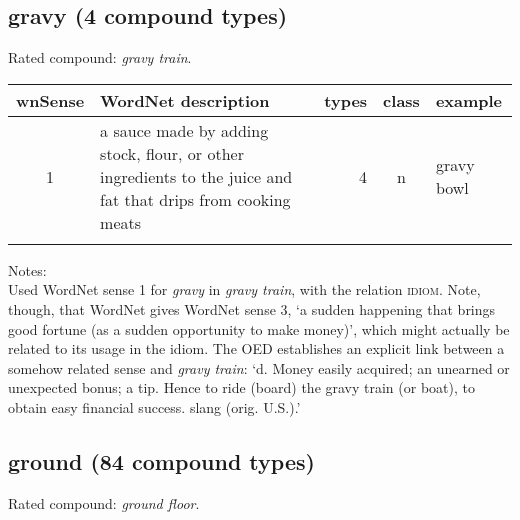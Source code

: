 \subsection{gravy        (4 compound types)}
Rated compound: \emph{gravy train}.


\noindent
\begin{longtable}{c>{\raggedright\arraybackslash}p{5cm}rc>{\raggedright\arraybackslash}p{2cm}}\lsptoprule
{\small wnSense}&WordNet description&types&class&example\\\midrule
1&a sauce made by adding stock, flour, or other ingredients to the juice and fat that drips from cooking meats&4&n&gravy bowl\\\lspbottomrule
\end{longtable}

\noindent
Notes:\\
Used WordNet sense 1 for \emph{gravy} in \emph{gravy train}, with the
relation \textsc{idiom}. Note, though, that WordNet gives WordNet sense 3, `a
sudden happening that brings good fortune (as a sudden opportunity to
make money)', which might actually be related to its usage in the
idiom. The OED establishes an explicit link between a somehow related
sense and \emph{gravy train}: `d. Money easily acquired; an unearned or
unexpected bonus; a tip. Hence to ride (board) the gravy train (or
boat), to obtain easy financial success. slang (orig. U.S.).'


\subsection{ground       (84 compound types)}
Rated compound: \emph{ground floor}.

\vspace*{1ex}

